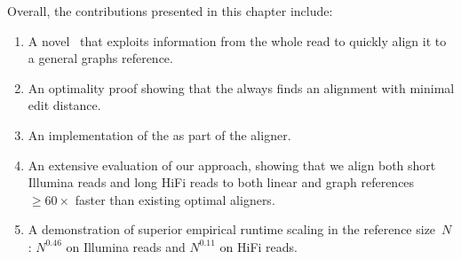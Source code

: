 Overall, the contributions presented in this chapter include:
\begin{enumerate}
    \item A novel \A~\seedh that exploits information from the whole read to
    quickly align it to a general graphs reference.
    \item An optimality proof showing that the \seedh always finds an alignment
    with minimal edit distance.
	\item An implementation of the \seedh as part of the \astarix aligner.
    \item An extensive evaluation of our approach, showing that we align both
    short Illumina reads and long HiFi reads to both linear and graph references
    $\geq 60 \times$ faster than existing optimal aligners.
    \item A demonstration of superior empirical runtime scaling in the reference
    size~$N$: $N^{0.46}$ on Illumina reads and $N^{0.11}$ on HiFi reads.
\end{enumerate}

